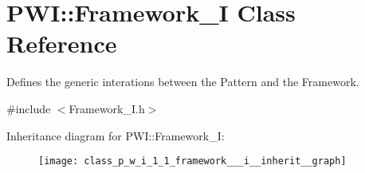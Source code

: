 \hypertarget{class_p_w_i_1_1_framework___i}{}\section{P\+WI\+:\+:Framework\+\_\+I Class Reference}
\label{class_p_w_i_1_1_framework___i}


Defines the generic interations between the Pattern and the Framework.  




{\ttfamily \#include $<$Framework\+\_\+\+I.\+h$>$}



Inheritance diagram for P\+WI\+:\+:Framework\+\_\+I\+:\nopagebreak
\begin{figure}[H]
\begin{center}
\leavevmode
\texttt{[image: class\_p\_w\_i\_1\_1\_framework\_\_\_i\_\_inherit\_\_graph]}
\end{center}
\end{figure}

